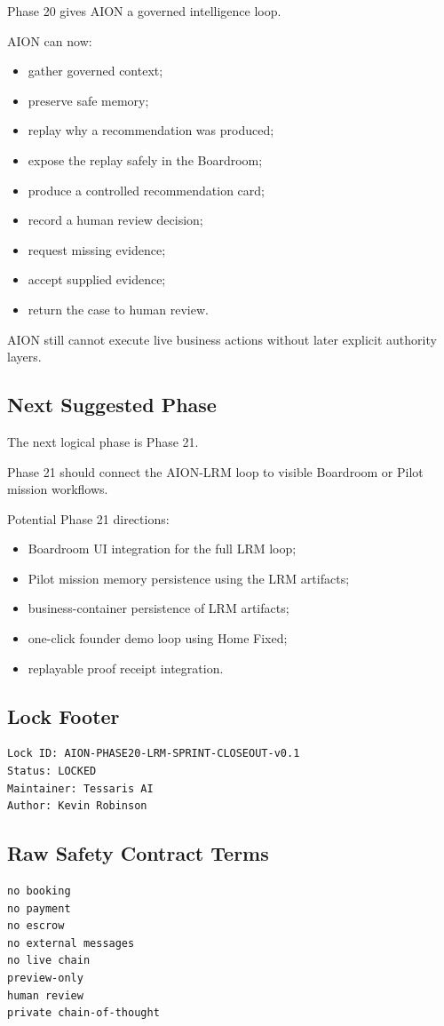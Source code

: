 Phase 20 gives AION a governed intelligence loop.

AION can now:

\begin{itemize}
  \item gather governed context;
  \item preserve safe memory;
  \item replay why a recommendation was produced;
  \item expose the replay safely in the Boardroom;
  \item produce a controlled recommendation card;
  \item record a human review decision;
  \item request missing evidence;
  \item accept supplied evidence;
  \item return the case to human review.
\end{itemize}

AION still cannot execute live business actions without later explicit authority layers.

\subsection{Next Suggested Phase}

The next logical phase is Phase 21.

Phase 21 should connect the AION-LRM loop to visible Boardroom or Pilot mission workflows.

Potential Phase 21 directions:

\begin{itemize}
  \item Boardroom UI integration for the full LRM loop;
  \item Pilot mission memory persistence using the LRM artifacts;
  \item business-container persistence of LRM artifacts;
  \item one-click founder demo loop using Home Fixed;
  \item replayable proof receipt integration.
\end{itemize}

\subsection{Lock Footer}

\begin{verbatim}
Lock ID: AION-PHASE20-LRM-SPRINT-CLOSEOUT-v0.1
Status: LOCKED
Maintainer: Tessaris AI
Author: Kevin Robinson
\end{verbatim}

\subsection{Raw Safety Contract Terms}

\begin{verbatim}
no booking
no payment
no escrow
no external messages
no live chain
preview-only
human review
private chain-of-thought
\end{verbatim}
